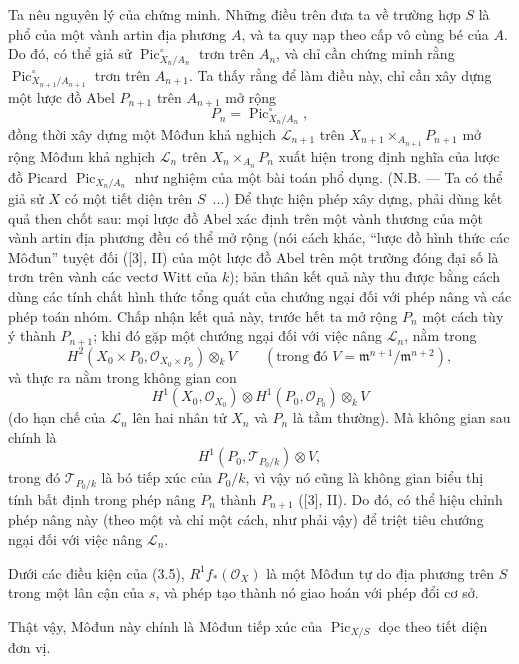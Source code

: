 Ta nêu nguyên lý của chứng minh. Những điều trên đưa ta về trường hợp $S$ là
phổ của một vành artin địa phương $A$, và ta quy nạp theo cấp vô cùng bé của
$A$. Do đó, có thể giả sử $\operatorname{Pic}_{X_n/A_n}^\circ$ trơn trên
$A_n$, và chỉ cần chứng minh rằng
$\operatorname{Pic}_{X_{n+1}/A_{n+1}}^\circ$ trơn trên $A_{n+1}$. Ta thấy
rằng để làm điều này, chỉ cần xây dựng một lược đồ Abel $P_{n+1}$ trên
$A_{n+1}$ mở rộng
\[
P_n=\operatorname{Pic}_{X_n/A_n}^\circ,
\]
đồng thời xây dựng một Môđun khả nghịch $\mathcal L_{n+1}$ trên
$X_{n+1}\times_{A_{n+1}}P_{n+1}$ mở rộng Môđun khả nghịch $\mathcal L_n$
trên $X_n\times_{A_n}P_n$ xuất hiện trong định nghĩa của lược đồ Picard
$\operatorname{Pic}_{X_n/A_n}$ như nghiệm của một bài toán phổ dụng. (N.B. ---
Ta có thể giả sử $X$ có một tiết diện trên $S$~...) Để thực hiện phép xây dựng,
phải dùng kết quả then chốt sau: mọi lược đồ Abel xác định trên một vành thương
của một vành artin địa phương đều có thể mở rộng (nói cách khác, ``lược đồ
hình thức các Môđun'' tuyệt đối ([3], II) của một lược đồ Abel trên một trường
đóng đại số là trơn trên vành các
vectơ Witt của $k$); bản thân kết quả này thu được bằng cách dùng các tính chất
hình thức tổng quát của chướng ngại đối với phép nâng và các phép toán nhóm.
Chấp nhận kết quả này, trước hết ta mở rộng $P_n$ một cách tùy ý thành
$P_{n+1}$; khi đó gặp một chướng ngại đối với việc nâng $\mathcal L_n$, nằm
trong
\[
H^2(X_0\times P_0,\mathcal O_{X_0\times P_0})\otimes_k V
\qquad(\text{trong đó }V=\mathfrak m^{n+1}/\mathfrak m^{n+2}),
\]
và thực ra nằm trong không gian con
\[
H^1(X_0,\mathcal O_{X_0})\otimes
H^1(P_0,\mathcal O_{P_0})\otimes_k V
\]
(do hạn chế của $\mathcal L_n$ lên hai nhân tử $X_n$ và $P_n$ là tầm thường).
Mà không gian sau chính là
\[
H^1(P_0,\mathcal T_{P_0/k})\otimes V,
\]
trong đó $\mathcal T_{P_0/k}$ là bó tiếp xúc của $P_0/k$, vì vậy nó cũng là
không gian biểu thị tính bất định trong phép nâng $P_n$ thành $P_{n+1}$ ([3],
II). Do đó, có thể hiệu chỉnh phép nâng này (theo một và chỉ một cách, như phải
vậy) để triệt tiêu chướng ngại đối với việc nâng $\mathcal L_n$.

 Dưới các điều kiện của (3.5),
$R^1f_*(\mathcal O_X)$ là một Môđun tự do địa phương trên $S$ trong một lân
cận của $s$, và phép tạo thành nó giao hoán với phép đổi cơ sở.

Thật vậy, Môđun này chính là Môđun tiếp xúc của
$\operatorname{Pic}_{X/S}$ dọc theo tiết diện đơn vị.

